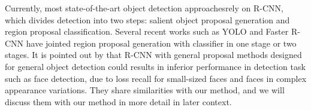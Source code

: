 Currently, most state-of-the-art object detection approaches\cite{ouyang2014deepid, li2015convolutional, erhan2014scalable,girshick2015fast}rely on R-CNN, which divides detection into two steps: salient object proposal generation and region proposal classification. Several recent works such as YOLO and Faster R-CNN have jointed region proposal generation with classifier in one stage or two stages. It is pointed out by \cite{farfade2015multi} that R-CNN with general proposal methods designed for general object detection could results in inferior performance in detection task such as face detection, due to loss recall for small-sized faces and faces in complex appearance variations. They share similarities with our method, and we will discuss them with our method in more detail in later context.  
 
